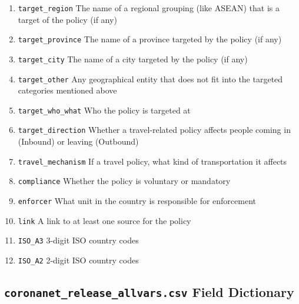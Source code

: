 \documentclass[]{article}
\begin{document}
\begin{enumerate}
\item
  \texttt{target\_region} The name of a regional grouping (like ASEAN) that is a target of the policy (if any)
\item
  \texttt{target\_province} The name of a province targeted by the policy (if any)
\item
  \texttt{target\_city} The name of a city targeted by the policy (if any)
\item
  \texttt{target\_other} Any geographical entity that does not fit into the targeted categories mentioned above
\item
  \texttt{target\_who\_what} Who the policy is targeted at
\item
  \texttt{target\_direction} Whether a travel-related policy affects people coming in (Inbound) or leaving (Outbound)
\item
  \texttt{travel\_mechanism} If a travel policy, what kind of transportation it affects
\item
  \texttt{compliance} Whether the policy is voluntary or mandatory
\item
  \texttt{enforcer} What unit in the country is responsible for enforcement
\item
  \texttt{link} A link to at least one source for the policy
\item
  \texttt{ISO\_A3} 3-digit ISO country codes
\item
  \texttt{ISO\_A2} 2-digit ISO country codes
\end{enumerate}

\hypertarget{coronanet_release_allvars.csv-field-dictionary}{%
\subsection*{\texorpdfstring{\texttt{coronanet\_release\_allvars.csv} Field Dictionary}{coronanet\_release\_allvars.csv Field Dictionary}}\label{coronanet_release_allvars.csv-field-dictionary}}
\end{document}
